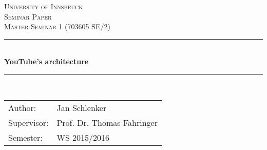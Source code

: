 \begin{titlepage}

\newcommand{\HRule}{\rule{\linewidth}{0.5mm}} %

\center %
 

\textsc{\LARGE University of Innsbruck}\\[1.5cm] %
\textsc{\Large Seminar Paper}\\[0.5cm] %
\textsc{\large Master Seminar 1 (703605 SE/2)}\\[0.5cm] %


\HRule \\[0.4cm]
{ \huge \bfseries YouTube's architecture}\\[0.4cm] %
\HRule \\[1.5cm]
 

\begin{center}
\begin{tabular}{l l}
Author: & Jan Schlenker \\
Supervisor: &  Prof. Dr. Thomas Fahringer \\
Semester: & WS 2015/2016
\end{tabular}
\end{center}




\end{titlepage}
